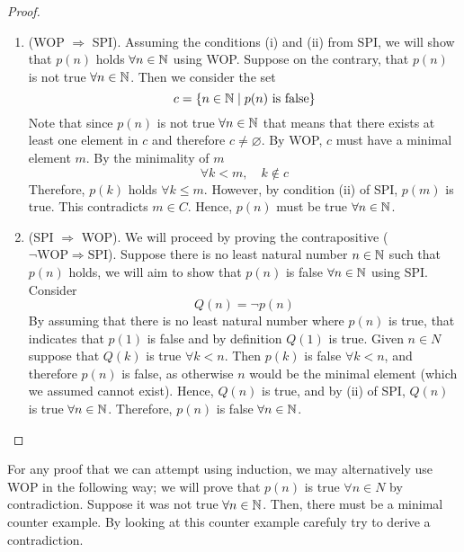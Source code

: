 \documentclass{article}
\begin{document}
\begin{nthm}
\end{nthm}

\begin{proof}\leavevmode
    \begin{enumerate}
        \item (WOP $\Rightarrow$ SPI). Assuming the conditions (i) and (ii) from SPI, we will show that $p(n)$ holds $\forall n \in \mathbb{N}$ using WOP.
        Suppose on the contrary, that $p(n)$ is not true $\forall n \in \mathbb{N}$. Then we consider the set
        \[
            c = \{n \in \N \mid p(n) \ \text{is false}\}
        \]
        Note that since $p(n)$ is not true $\forall n \in \mathbb{N}$ that means that there exists at least one element in $c$ and therefore $c \neq \varnothing$. By WOP, $c$ must have a minimal element $m$. By the minimality of $m$
        \[
            \forall  k < m, \quad k \notin c  
        \]
        Therefore, $p(k)$ holds $\forall k \leq m$. However, by condition (ii) of SPI, $p(m)$ is true. This contradicts $m \in C$. \contradiction
        Hence, $p(n)$ must be true $\forall n \in \mathbb{N}$.
        \item (SPI $\Rightarrow$ WOP). We will proceed by proving the contrapositive ($\neg \text{WOP} \Rightarrow \text{SPI}$).
        Suppose there is no least natural number $n \in \mathbb{N}$ such that $p(n)$ holds, we will aim to show that $p(n)$ is false $\forall n \in \mathbb{N}$ using SPI. Consider
        \[
            Q(n) = \neg p(n)  
        \]
        By assuming that there is no least natural number where $p(n)$ is true, that indicates that $p(1)$ is false and by definition $Q(1)$ is true. Given $n \in N$ suppose that $Q(k)$ is true $\forall k < n$.
        Then $p(k)$ is false $\forall k < n$, and therefore $p(n)$ is false, as otherwise $n$ would be the minimal element (which we assumed cannot exist).
        Hence, $Q(n)$ is true, and by (ii) of SPI, $Q(n)$ is true $\forall n \in \mathbb{N}$.
        Therefore, $p(n)$ is false $\forall n \in \mathbb{N}$.
    \end{enumerate}
\end{proof}

\begin{remark}
    For any proof that we can attempt using induction, we may alternatively use WOP in the following way; we will prove that $p(n)$ is true $\forall n \in N$ by contradiction. Suppose it was not true $\forall n \in \mathbb{N}$. Then, there must be a minimal counter example. By looking at this counter example carefuly try to derive a contradiction.
\end{remark}
\end{document}
